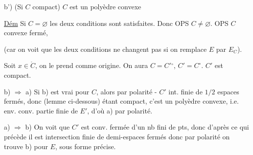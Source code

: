 b') (Si $C$ compact) $C$ est un polyèdre convexe


\uline{Dém} Si $C=\varnothing$ les deux conditions sont satisfaites. Donc OPS $C\ne\varnothing$.  OPS $C$ convexe fermé,

  (car on voit que les deux conditions  ne changent pas si on remplace $E$ par $E_C$).

Soit $x\in\mathring C$, on le prend comme origine. On aura $C=C'{}^{\circ}$,  $C'=C^\circ$.  $C'$ est compact.




b) $\Rightarrow$ a) Si b) est vrai pour $C$, alors par polarité - $C'$  int. finie de $1/2$ espaces fermés, donc (lemme ci-dessous) étant compact, c'est un polyèdre convexe, i.e. env. conv.  partie finie de $E'$, d'où a) par polarité.


a) $\Longrightarrow$ b) On voit  que $C'$ est  conv. fermée d'un nb fini de pts,  donc d'après ce qui précède il  est intersection finie de demi-espaces  fermés donc par polarité on trouve b) pour $E$, sous forme précise.

